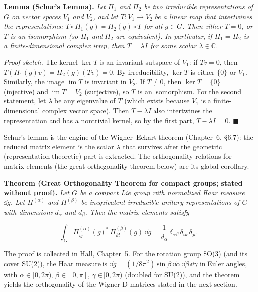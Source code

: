 \medskip\noindent\textbf{Lemma (Schur's Lemma).} \emph{Let $\Pi_1$ and $\Pi_2$ be two irreducible representations of $G$ on vector spaces $V_1$ and $V_2$, and let $T : V_1 \to V_2$ be a linear map that intertwines the representations: $T \circ \Pi_1(g) = \Pi_2(g) \circ T$ for all $g \in G$. Then either $T = 0$, or $T$ is an isomorphism (so $\Pi_1$ and $\Pi_2$ are equivalent). In particular, if $\Pi_1 = \Pi_2$ is a finite-dimensional complex irrep, then $T = \lambda I$ for some scalar $\lambda \in \mathbb{C}$.}

\emph{Proof sketch.} The kernel $\ker T$ is an invariant subspace of $V_1$: if $Tv = 0$, then $T(\Pi_1(g)v) = \Pi_2(g)(Tv) = 0$. By irreducibility, $\ker T$ is either $\{0\}$ or $V_1$. Similarly, the image $\operatorname{im} T$ is invariant in $V_2$. If $T \neq 0$, then $\ker T = \{0\}$ (injective) and $\operatorname{im} T = V_2$ (surjective), so $T$ is an isomorphism. For the second statement, let $\lambda$ be any eigenvalue of $T$ (which exists because $V_1$ is a finite-dimensional complex vector space). Then $T - \lambda I$ also intertwines the representation and has a nontrivial kernel, so by the first part, $T - \lambda I = 0$. \hfill $\blacksquare$

Schur's lemma is the engine of the Wigner--Eckart theorem (Chapter~6, §6.7): the reduced matrix element is the scalar $\lambda$ that survives after the geometric (representation-theoretic) part is extracted. The orthogonality relations for matrix elements (the great orthogonality theorem below) are its global corollary.

\medskip\noindent\textbf{Theorem (Great Orthogonality Theorem for compact groups; stated without proof).} \emph{Let $G$ be a compact Lie group with normalized Haar measure $\dd g$. Let $\Pi^{(\alpha)}$ and $\Pi^{(\beta)}$ be inequivalent irreducible unitary representations of $G$ with dimensions $d_\alpha$ and $d_\beta$. Then the matrix elements satisfy}
\begin{linenomath}
    \begin{equation}
        \int_G \Pi^{(\alpha)}_{ij}(g)^*\,\Pi^{(\beta)}_{kl}(g)\,\dd g = \frac{1}{d_\alpha}\,\delta_{\alpha\beta}\,\delta_{ik}\,\delta_{jl}.
        \label{eq:great-orthogonality}
    \end{equation}
\end{linenomath}

The proof is collected in Hall, Chapter~5. For the rotation group SO(3) (and its cover SU(2)), the Haar measure is $\dd g = (1/8\pi^2)\sin\beta\,\dd\alpha\,\dd\beta\,\dd\gamma$ in Euler angles, with $\alpha \in [0,2\pi)$, $\beta \in [0,\pi]$, $\gamma \in [0,2\pi)$ (doubled for SU(2)), and the theorem yields the orthogonality of the Wigner D-matrices stated in the next section.

